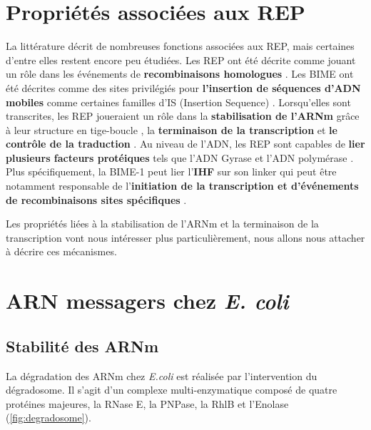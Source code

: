 \documentclass[12pt,a4paper]{report}
\begin{document}
\begin{onehalfspace}
\section*{Propriétés associées aux REP}
La littérature décrit de nombreuses fonctions associées aux REP, mais certaines d'entre elles restent encore peu étudiées. Les REP ont été décrite comme jouant un rôle dans les événements de \textbf{recombinaisons homologues} \citep{Kofoid2003}. Les BIME ont été décrites comme des sites privilégiés pour \textbf{l'insertion de séquences d'ADN mobiles} comme certaines familles d'IS (Insertion Sequence) \citep{Bachellier1997,Clement1999,Choi2003,Tobes2005}. Lorsqu'elles sont transcrites, les REP joueraient un rôle dans la \textbf{stabilisation de l'ARNm} grâce à leur structure en tige-boucle \citep{Newbury1987,Espeli2001,Khemici2004,Aguena2009}, la \textbf{terminaison de la transcription} \citep{Gilson1986} et \textbf{le contrôle de la traduction} \citep{Stern1988}. Au niveau de l'ADN, les REP sont capables de \textbf{lier plusieurs facteurs protéiques} tels que l'ADN Gyrase \citep{Espeli1997} et l'ADN polymérase \citep{Gilson1990}. Plus spécifiquement, la BIME-1 peut lier l'\textbf{IHF} sur son linker \citep{Boccard1993} qui peut être notamment responsable de l'\textbf{initiation de la transcription et d’événements de recombinaisons sites spécifiques} \citep{Goosen1995}.

Les propriétés liées à la stabilisation de l'ARNm et la terminaison de la transcription vont nous intéresser plus particulièrement, nous allons nous attacher à décrire ces mécanismes.

\section*{ARN messagers chez \textit{E. coli}}

\subsection*{Stabilité des ARNm}
La dégradation des ARNm chez \textit{E.coli} est réalisée par l'intervention du dégradosome. Il s'agit d'un complexe multi-enzymatique composé de quatre protéines majeures, la RNase E, la PNPase, la RhlB et l'Enolase (\autoref{fig:degradosome}).


\end{onehalfspace}
\end{document}
